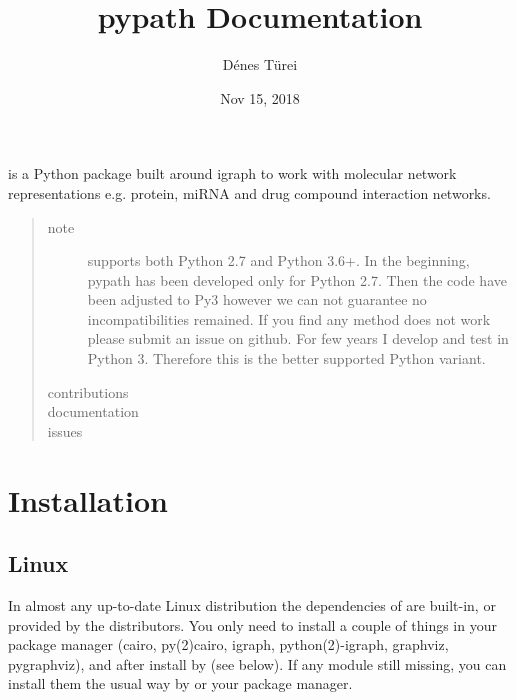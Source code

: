 \documentclass[letterpaper,10pt,english]{sphinxmanual}
\title{pypath Documentation}
\date{Nov 15, 2018}
\author{Dénes Türei}
\begin{document}
\maketitle
\sphinxtableofcontents
{}\label{\detokenize{index::doc}}


 is a Python package built around igraph to work with molecular
network representations e.g. protein, miRNA and drug compound interaction
networks.
\begin{quote}\begin{description}
\item[{note}] \leavevmode
{} supports both Python 2.7 and Python 3.6+. In the beginning,
pypath has been developed only for Python 2.7. Then the code have been
adjusted to Py3 however we can not guarantee no incompatibilities
remained. If you find any method does not work please submit an issue on
github. For few years I develop and test  in Python 3. Therefore
this is the better supported Python variant.

\item[{contributions}] \leavevmode
{}

\item[{documentation}] \leavevmode
{}

\item[{issues}] \leavevmode
{}

\end{description}\end{quote}


\chapter{Installation}
\label{\detokenize{installation:installation}}\label{\detokenize{installation::doc}}

\section{Linux}
\label{\detokenize{installation:linux}}
In almost any up-to-date Linux distribution the dependencies of  are
built-in, or provided by the distributors. You only need to install a couple
of things in your package manager (cairo, py(2)cairo, igraph,
python(2)-igraph, graphviz, pygraphviz), and after install  by 
(see below). If any module still missing, you can install them the usual way
by  or your package manager.
\end{document}
